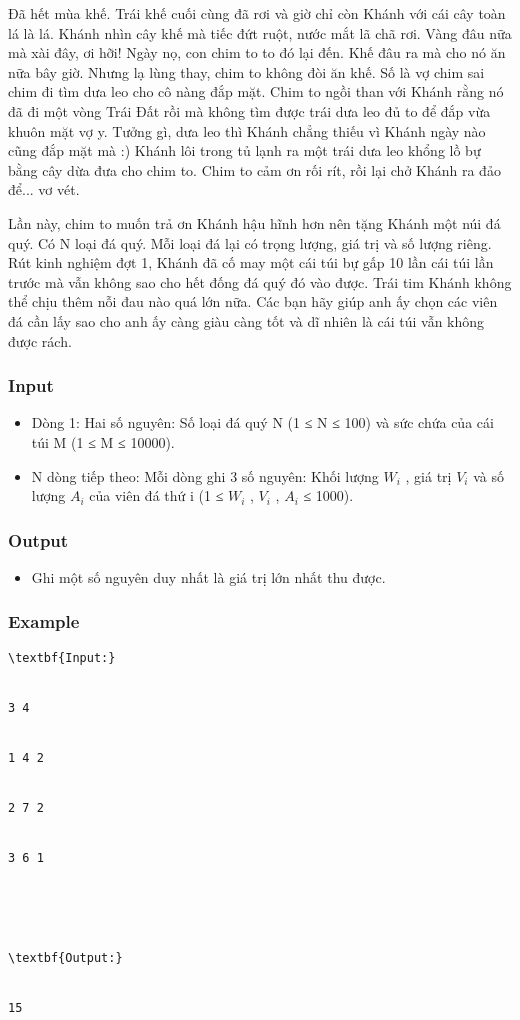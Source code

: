 



   Đã hết mùa khế. Trái khế cuối cùng đã rơi và giờ chỉ còn Khánh với cái cây toàn lá là lá. Khánh nhìn cây khế mà tiếc đứt ruột, nước mắt lã chã rơi. Vàng đâu nữa mà xài đây, ơi hỡi! Ngày nọ, con chim to to đó lại đến. Khế đâu ra mà cho nó ăn nữa bây giờ. Nhưng lạ lùng thay, chim to không đòi ăn khế. Số là vợ chim sai chim đi tìm dưa leo cho cô nàng đắp mặt. Chim to ngồi than với Khánh rằng nó đã đi một vòng Trái Đất rồi mà không tìm được trái dưa leo đủ to để đắp vừa khuôn mặt vợ y. Tưởng gì, dưa leo thì Khánh chẳng thiếu vì Khánh ngày nào cũng đắp mặt mà :) Khánh lôi trong tủ lạnh ra một trái dưa leo khổng lồ bự bằng cây dừa đưa cho chim to. Chim to cảm ơn rối rít, rồi lại chở Khánh ra đảo để... vơ vét.  

   Lần này, chim to muốn trả ơn Khánh hậu hĩnh hơn nên tặng Khánh một núi đá quý. Có N loại đá quý. Mỗi loại đá lại có trọng lượng, giá trị và số lượng riêng. Rút kinh nghiệm đợt 1, Khánh đã cố may một cái túi bự gấp 10 lần cái túi lần trước mà vẫn không sao cho hết đống đá quý đó vào được. Trái tim Khánh không thể chịu thêm nỗi đau nào quá lớn nữa. Các bạn hãy giúp anh ấy chọn các viên đá cần lấy sao cho anh ấy càng giàu càng tốt và dĩ nhiên là cái túi vẫn không được rách.  

\subsubsection{   Input  }
\begin{itemize}
	\item     Dòng 1: Hai số nguyên: Số loại đá quý N (1 ≤ N ≤ 100) và sức chứa của cái túi M (1 ≤ M ≤ 10000).   
	\item     N dòng tiếp theo: Mỗi dòng ghi 3 số nguyên: Khối lượng $W_{i}$    , giá trị $V_{i}$    và số lượng $A_{i}$    của viên đá thứ i (1 ≤ $W_{i}$    , $V_{i}$    , $A_{i}$    ≤ 1000).   
\end{itemize}

\subsubsection{   Output  }
\begin{itemize}
	\item     Ghi một số nguyên duy nhất là giá trị lớn nhất thu được.   
\end{itemize}

\subsubsection{   Example  }
\begin{verbatim}
\textbf{Input:}


3 4


1 4 2


2 7 2


3 6 1





\textbf{Output:}


15


\end{verbatim}
